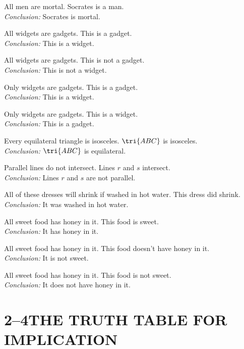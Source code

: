 \documentclass[11pt]{book}
\theoremstyle{bkplain}
\theoremstyle{XIplainnote}
\theoremstyle{bkplain}
\theoremstyle{bkplain}
\begin{document}
\begin{exercisecols}
\begin{exlist}\setcounter{exlisti}{7}
\item All men are mortal. Socrates is a man.\\
      \emph{Conclusion:} Socrates is mortal.
\item All widgets are gadgets. This is a gadget.\\
      \emph{Conclusion:} This is a widget.
\item All widgets are gadgets. This is not a gadget.\\
      \emph{Conclusion:} This is not a widget.
\item Only widgets are gadgets. This is a gadget.\\
      \emph{Conclusion:} This is a widget.
\item Only widgets are gadgets. This is a widget.\\
      \emph{Conclusion:} This is a gadget.
\item Every equilateral triangle is isosceles. $\tri{ABC}$ is isosceles.\\
      \emph{Conclusion:} $\tri{ABC}$ is equilateral.
\item Parallel lines do not intersect. Lines $r$ and $s$ intersect.\\
      \emph{Conclusion:} Lines $r$ and $s$ are not parallel.
\item All of these dresses will shrink if washed in hot water. This dress did
      shrink.\\
      \emph{Conclusion:} It was washed in hot water.
\item All sweet food has honey in it. This food is sweet.\\
      \emph{Conclusion:} It has honey in it.
\item All sweet food has honey in it. This food doesn't have honey in it.\\
      \emph{Conclusion:} It is not sweet.
\item All sweet food has honey in it. This food is not sweet.\\
      \emph{Conclusion:} It does not have honey in it.
\end{exlist}
\end{exercisecols}

\section*{2--4\quad THE TRUTH TABLE FOR IMPLICATION}
\end{document}
